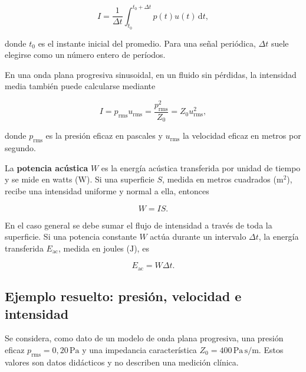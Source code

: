 \begin{equation}
    I=\frac{1}{\Delta t}
      \int_{t_0}^{t_0+\Delta t}p(t)u(t)\,\mathrm{d}t,
    \label{eq:u4-intensidad-media}
\end{equation}

donde \(t_0\) es el instante inicial del promedio. Para una señal periódica,
\(\Delta t\) suele elegirse como un número entero de períodos.

En una onda plana progresiva sinusoidal, en un fluido sin pérdidas, la
intensidad media también puede calcularse mediante~\cite{xiangBlauert2021}

\begin{equation}
    I=p_\mathrm{rms}u_\mathrm{rms}
     =\frac{p_\mathrm{rms}^2}{Z_0}
     =Z_0u_\mathrm{rms}^2,
    \label{eq:u4-intensidad-onda-plana}
\end{equation}

donde \(p_\mathrm{rms}\) es la presión eficaz en pascales y
\(u_\mathrm{rms}\) la velocidad eficaz en metros por segundo.

La \textbf{potencia acústica} \(W\) es la energía acústica transferida por
unidad de tiempo y se mide en watts (\(\text{W}\)). Si una superficie \(S\),
medida en metros cuadrados (\(\text{m}^2\)), recibe una intensidad uniforme y
normal a ella, entonces

\begin{equation}
    W=IS.
    \label{eq:u4-potencia-uniforme}
\end{equation}

En el caso general se debe sumar el flujo de intensidad a través de toda la
superficie. Si una potencia constante \(W\) actúa durante un intervalo
\(\Delta t\), la energía transferida \(E_\mathrm{ac}\), medida en joules
(\(\text{J}\)), es

\begin{equation}
    E_\mathrm{ac}=W\Delta t.
    \label{eq:u4-energia-acustica}
\end{equation}

\subsection{Ejemplo resuelto: presión, velocidad e intensidad}
\label{sec:u4-ejemplo-magnitudes}

Se considera, como dato de un modelo de onda plana progresiva, una presión
eficaz \(p_\mathrm{rms}=0{,}20\,\text{Pa}\) y una impedancia característica
\(Z_0=400\,\text{Pa}\,\text{s}/\text{m}\). Estos valores son datos
didácticos y no describen una medición clínica.


